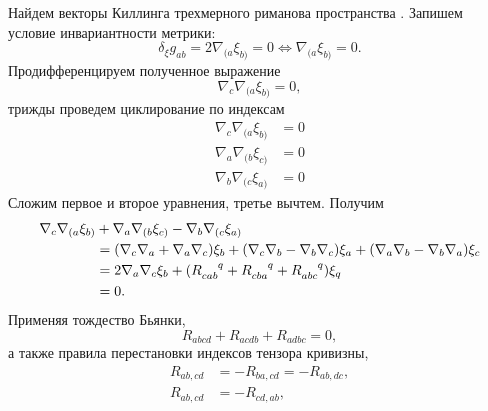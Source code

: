 \documentclass[12pt,a4paper]{article}
\begin{document}
        Найдем векторы Киллинга трехмерного риманова пространства \cite{symmetry_and_killing_fields}. Запишем условие инвариантности метрики:
        \begin{equation}
            \delta_\xi g_{ab}
                = 2 \nabla_{(a} \xi_{b)}
                = 0
                \Leftrightarrow \nabla_{(a} \xi_{b)} = 0.
        \end{equation}
        Продифференцируем полученное выражение
        \begin{equation}
            \nabla_c \nabla_{(a} \xi_{b)} = 0,
        \end{equation}
        трижды проведем циклирование по индексам
        \begin{equation}\begin{aligned}
            \nabla_c \nabla_{(a} \xi_{b)} &= 0 \\
            \nabla_a \nabla_{(b} \xi_{c)} &= 0 \\
            \nabla_b \nabla_{(c} \xi_{a)} &= 0
        \end{aligned}\end{equation}
        Сложим первое и второе уравнения, третье вычтем. Получим
        \begin{equation}\begin{aligned}
            \nabla_c \nabla_{(a} \xi_{b)} &+
            \nabla_a \nabla_{(b} \xi_{c)} -
            \nabla_b \nabla_{(c} \xi_{a)} \\
                &=  \qty( \nabla_c \nabla_a + \nabla_a \nabla_c ) \xi_b +
                    \qty( \nabla_c \nabla_b - \nabla_b \nabla_c ) \xi_a +
                    \qty( \nabla_a \nabla_b - \nabla_b \nabla_a ) \xi_c \\
                &= 2 \nabla_a \nabla_c \xi_b + \qty(
                    R_{cab}^{\hphantom{cab}q} +
                    R_{cba}^{\hphantom{cba}q} +
                    R_{abc}^{\hphantom{abc}q}
                ) \xi_q \\
                &= 0 .
        \end{aligned}\end{equation}
        Применяя тождество Бьянки,
        \begin{equation}
            R_{abcd} + R_{acdb} + R_{adbc} = 0,
        \end{equation}
        а также правила перестановки индексов тензора кривизны,
        \begin{equation}\begin{aligned}
            R_{ab,cd} &= - R_{ba,cd} = - R_{ab,dc}, \\
            R_{ab,cd} &= - R_{cd,ab}, \\
        \end{aligned}\end{equation}
\end{document}
